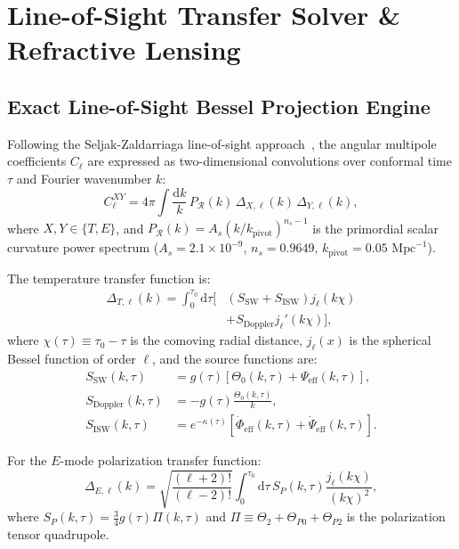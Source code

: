 \documentclass[aps,prd,reprint,superscriptaddress,nofootinbib,twocolumn]{revtex4-2}
\begin{document}
\section{Line-of-Sight Transfer Solver \& Refractive Lensing}
\label{sec:transfer}

\subsection{Exact Line-of-Sight Bessel Projection Engine}

Following the Seljak-Zaldarriaga line-of-sight approach~\cite{Seljak1996}, the angular multipole coefficients $C_\ell$ are expressed as two-dimensional convolutions over conformal time $\tau$ and Fourier wavenumber $k$:
\begin{equation}
\label{eq:cl_integral}
C_\ell^{XY} = 4\pi \int \frac{\mathrm{d}k}{k}\,P_{\mathcal{R}}(k)\,\Delta_{X,\ell}(k)\,\Delta_{Y,\ell}(k),
\end{equation}
where $X, Y \in \{T, E\}$, and $P_{\mathcal{R}}(k) = A_s (k/k_{\text{pivot}})^{n_s - 1}$ is the primordial scalar curvature power spectrum ($A_s = 2.1 \times 10^{-9}$, $n_s = 0.9649$, $k_{\text{pivot}} = 0.05\text{ Mpc}^{-1}$).

The temperature transfer function is:
\begin{equation}
\label{eq:delta_T}
\begin{aligned}
\Delta_{T,\ell}(k) = \int_0^{\tau_0} \mathrm{d}\tau \Big[ &(S_{\text{SW}} + S_{\text{ISW}}) j_\ell(k\chi) \\
&+ S_{\text{Doppler}} j_\ell'(k\chi) \Big],
\end{aligned}
\end{equation}
where $\chi(\tau) \equiv \tau_0 - \tau$ is the comoving radial distance, $j_\ell(x)$ is the spherical Bessel function of order $\ell$, and the source functions are:
\begin{align}
\label{eq:source_sw}
S_{\text{SW}}(k, \tau) &= g(\tau) \left[ \Theta_0(k, \tau) + \Psi_{\text{eff}}(k, \tau) \right], \\
\label{eq:source_doppler}
S_{\text{Doppler}}(k, \tau) &= -g(\tau) \frac{\dot{\Theta}_0(k, \tau)}{k}, \\
\label{eq:source_isw}
S_{\text{ISW}}(k, \tau) &= e^{-\kappa(\tau)} \left[ \dot{\Phi}_{\text{eff}}(k, \tau) + \dot{\Psi}_{\text{eff}}(k, \tau) \right].
\end{align}

For the $E$-mode polarization transfer function:
\begin{equation}
\label{eq:delta_E}
\Delta_{E,\ell}(k) = \sqrt{\frac{(\ell+2)!}{(\ell-2)!}} \int_0^{\tau_0} \mathrm{d}\tau\,S_P(k, \tau) \frac{j_\ell(k\chi)}{(k\chi)^2},
\end{equation}
where $S_P(k, \tau) = \frac{3}{4} g(\tau) \Pi(k, \tau)$ and $\Pi \equiv \Theta_2 + \Theta_{P0} + \Theta_{P2}$ is the polarization tensor quadrupole.
\end{document}
